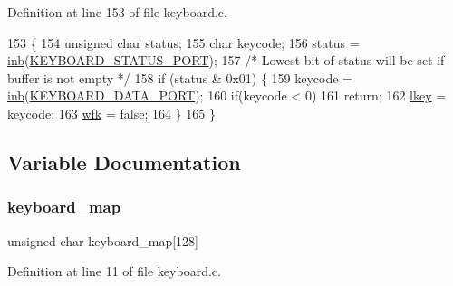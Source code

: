 Definition at line 153 of file keyboard.\+c.


\begin{DoxyCode}
153                                  \{
154     \textcolor{keywordtype}{unsigned} \textcolor{keywordtype}{char} status;
155     \textcolor{keywordtype}{char} keycode;
156     status = \hyperlink{a00158_a0223c8898dfec29069879dc51076e28a_a0223c8898dfec29069879dc51076e28a}{inb}(\hyperlink{a00035_ab79ca089665bc7f5cc151883d1bc69ed_ab79ca089665bc7f5cc151883d1bc69ed}{KEYBOARD\_STATUS\_PORT});
157     \textcolor{comment}{/* Lowest bit of status will be set if buffer is not empty */}
158     \textcolor{keywordflow}{if} (status & 0x01) \{
159         keycode = \hyperlink{a00158_a0223c8898dfec29069879dc51076e28a_a0223c8898dfec29069879dc51076e28a}{inb}(\hyperlink{a00035_a49e0a04e81098085d2948c1e9f8c99cb_a49e0a04e81098085d2948c1e9f8c99cb}{KEYBOARD\_DATA\_PORT});
160         \textcolor{keywordflow}{if}(keycode < 0)
161             \textcolor{keywordflow}{return};
162         \hyperlink{a00032_ade374650022cb30c4f5591a8dafad685_ade374650022cb30c4f5591a8dafad685}{lkey} = keycode;
163         \hyperlink{a00032_a6ddd5223379778858edc46ffbec19775_a6ddd5223379778858edc46ffbec19775}{wfk} = \textcolor{keyword}{false};
164     \}
165 \}
\end{DoxyCode}


\subsection{Variable Documentation}
\mbox{\label{a00032_a5d0b5e007d1b57bf84d1c03439810533_a5d0b5e007d1b57bf84d1c03439810533}} 
\subsubsection{\texorpdfstring{keyboard\+\_\+map}{keyboard\_map}}
{\footnotesize\ttfamily unsigned char keyboard\+\_\+map\mbox{[}128\mbox{]}}



Definition at line 11 of file keyboard.\+c.

\mbox{\label{a00032_ade374650022cb30c4f5591a8dafad685_ade374650022cb30c4f5591a8dafad685}} 
